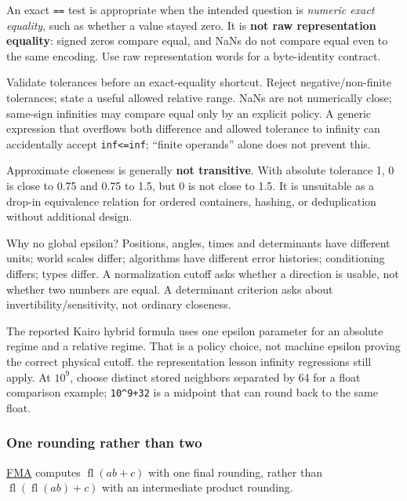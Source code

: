 An exact \texttt{==} test is appropriate when the intended question is \emph{numeric exact equality}, such as whether a value stayed zero. It is \textbf{not raw representation equality}: signed zeros compare equal, and NaNs do not compare equal even to the same encoding. Use raw representation words for a byte-identity contract.

Validate tolerances before an exact-equality shortcut. Reject negative/non-finite tolerances; state a useful allowed relative range. NaNs are not numerically close; same-sign infinities may compare equal only by an explicit policy. A generic expression that overflows both difference and allowed tolerance to infinity can accidentally accept \texttt{inf\textless{}=inf}; ``finite operands'' alone does not prevent this.

Approximate closeness is generally \textbf{not transitive}. With absolute tolerance 1, 0 is close to 0.75 and 0.75 to 1.5, but 0 is not close to 1.5. It is unsuitable as a drop-in equivalence relation for ordered containers, hashing, or deduplication without additional design.

Why no global epsilon? Positions, angles, times and determinants have different units; world scales differ; algorithms have different error histories; conditioning differs; types differ. A normalization cutoff asks whether a direction is usable, not whether two numbers are equal. A determinant criterion asks about invertibility/sensitivity, not ordinary closeness.

The reported Kairo hybrid formula uses one epsilon parameter for an absolute regime and a relative regime. That is a policy choice, not machine epsilon proving the correct physical cutoff. the representation lesson infinity regressions still apply. At \(10^9\), choose distinct stored neighbors separated by 64 for a float comparison example; \texttt{10\^{}9+32} is a midpoint that can round back to the same float.

\subsubsection{One rounding rather than two}\label{01-foundations-i-ch001-one-rounding-rather-than-two}

\hypertarget{01-foundations-i-ch001-one-rounding-rather-than-two}{}

\hyperref[appendix-41e8ef22a21e]{FMA} computes \(\operatorname{fl}(ab+c)\) with one final rounding, rather than \(\operatorname{fl}(\operatorname{fl}(ab)+c)\) with an intermediate product rounding.

